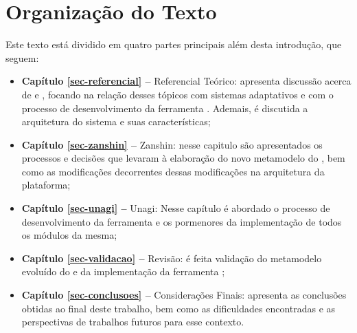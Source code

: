 \section{Organização do Texto}
\label{sec-intro-organizacao}

Este texto está dividido em quatro partes principais além desta introdução, que seguem:

\begin{itemize}
	\item \textbf{Capítulo \ref{sec-referencial} --} Referencial Teórico: apresenta discussão acerca de \gore e \mdd, focando na relação desses tópicos com sistemas adaptativos e com o processo de desenvolvimento da ferramenta \unagi. Ademais, é discutida a arquitetura do sistema \zanshin e suas características;
	
	\item \textbf{Capítulo \ref{sec-zanshin} --} Zanshin: nesse capitulo são apresentados os processos e decisões que levaram à elaboração do novo metamodelo do \zanshin, bem como as modificações decorrentes dessas modificações na arquitetura da plataforma;
	
	\item \textbf{Capítulo \ref{sec-unagi} --} Unagi: Nesse capítulo é abordado o processo de desenvolvimento da ferramenta \unagi e os pormenores da implementação de todos os módulos da mesma;
	
	\item \textbf{Capítulo \ref{sec-validacao} --} Revisão: é feita validação do metamodelo evoluído do \zanshin e da implementação da ferramenta \unagi;
	
	\item \textbf{Capítulo \ref{sec-conclusoes} --} Considerações Finais: apresenta as conclusões obtidas ao final deste trabalho, bem como as dificuldades encontradas e as perspectivas de trabalhos futuros para esse contexto.
\end{itemize}









